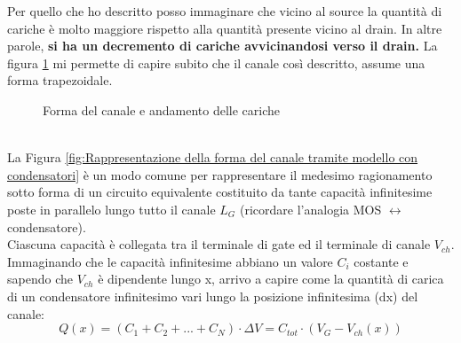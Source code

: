 Per quello che ho descritto posso immaginare che vicino al source la quantità di cariche è molto maggiore rispetto alla quantità presente vicino al drain. In altre parole, \textbf{si ha un decremento di cariche avvicinandosi verso il drain.}
La figura \ref{fig:Forma del canale e andamento delle cariche} mi permette di capire subito che il canale così descritto, assume una forma trapezoidale.
%
\begin{figure}[hbt!]
    \centering
    \caption{Forma del canale e andamento delle cariche}
    \label{fig:Forma del canale e andamento delle cariche}
\end{figure}\\
%
La Figura \ref{fig:Rappresentazione della forma del canale tramite modello con condensatori} è un modo comune per rappresentare il medesimo ragionamento sotto forma di un circuito equivalente costituito da tante capacità infinitesime poste in parallelo lungo tutto il canale $L_G$ (ricordare l'analogia MOS $\leftrightarrow$ condensatore).\\
\newpage
Ciascuna capacità è collegata tra il terminale di gate ed il terminale di canale $V_{ch}$. Immaginando che le capacità infinitesime abbiano un valore $C_i$ costante e sapendo che $V_{ch}$ è dipendente lungo x, arrivo a capire come la quantità di carica di un condensatore infinitesimo vari lungo la posizione infinitesima (dx) del canale:
%
\begin{equation}
    Q(x)=(C_1+C_2+...+C_N) \cdot \Delta V= C_{tot} \cdot (V_G-V_{ch}(x))
\end{equation}
%
